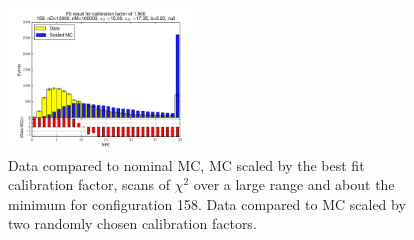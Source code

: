 \begin{figure}[htbp]
\begin{center}
\includegraphics[width=0.45\textwidth]{../FIGURES/158/FIG_Fit_result_for_calibration_factor_of_1_900.pdf} 
\caption{Data compared to nominal MC, MC scaled by the best fit calibration factor, scans of $\chi^2$ over a large range and about the minimum for configuration 158. Data compared to MC scaled by two randomly chosen calibration factors.} 
\label{tab:best_158} 
\end{center} \end{figure} 

